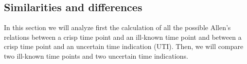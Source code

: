 

\subsection{\label{subsec:sim-dif}Similarities and differences}





In this section we will analyze first the calculation of all the possible Allen's relations between a crisp time point and an ill-known time point and between a crisp time point and an uncertain time indication (UTI). Then, we will compare two ill-known time points and two uncertain time indications.

% 
% 
